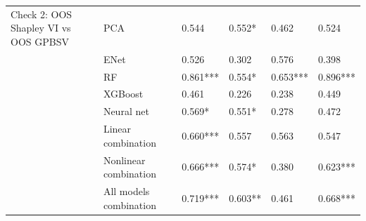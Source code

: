 \begin{tabular}{llllll}
Check 2: OOS Shapley VI vs OOS GPBSV & PCA &     0.544 &    0.552* &     0.462 &     0.524 \\
                                     & ENet &     0.526 &     0.302 &     0.576 &     0.398 \\
                                     & RF &  0.861*** &    0.554* &  0.653*** &  0.896*** \\
                                     & XGBoost &     0.461 &     0.226 &     0.238 &     0.449 \\
                                     & Neural net &    0.569* &    0.551* &     0.278 &     0.472 \\
                                     & Linear combination &  0.660*** &     0.557 &     0.563 &     0.547 \\
                                     & Nonlinear combination &  0.666*** &    0.574* &     0.380 &  0.623*** \\
                                     & All models combination &  0.719*** &   0.603** &     0.461 &  0.668*** \\
\bottomrule
\end{tabular}
